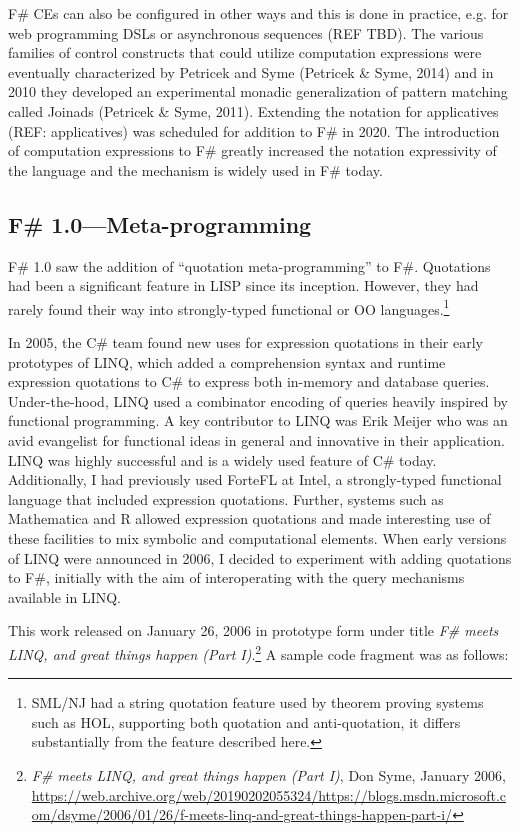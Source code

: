 \documentclass[acmsmall]{acmart}\settopmatter{}
\begin{document}
F\# CEs can also be configured in other ways and this is done in practice, e.g. for web programming DSLs or asynchronous sequences (REF TBD).
The various families of control constructs that could utilize computation expressions were eventually characterized by Petricek
and Syme (Petricek \& Syme, 2014) and in 2010 they developed an experimental monadic generalization of pattern matching called Joinads (Petricek \& Syme, 2011).
Extending the notation for applicatives (REF: applicatives) was scheduled for addition to F\# in 2020. The introduction of computation expressions to F\# greatly increased the notation expressivity of the language
and the mechanism is widely used in F\# today.

\subsection*{F\# 1.0---Meta-programming}

F\# 1.0 saw the addition of “quotation meta-programming” to F\#.  Quotations had been a significant feature in LISP since its inception. However, they had rarely 
found their way into strongly-typed functional or OO languages.\footnote{SML/NJ had a string quotation feature used by theorem proving systems such as HOL, supporting both quotation and anti-quotation, it differs substantially from the feature described here.}


In 2005, the C\# team found new uses for expression quotations in their early prototypes of LINQ, which added a comprehension syntax and runtime expression quotations to C\# to express both in-memory and database queries. Under-the-hood, LINQ used a combinator encoding of queries heavily inspired by functional programming. A key contributor to LINQ was Erik Meijer who was an avid evangelist for functional ideas in general and innovative in their application. LINQ was highly successful and is a widely used feature of C\# today.  Additionally, I had previously used ForteFL at Intel, a strongly-typed functional language that included expression quotations.  Further, systems such as Mathematica and R allowed expression quotations and made interesting use of these facilities to mix symbolic and computational elements. When early versions of LINQ were announced in 2006, I decided to experiment with adding quotations to F\#, initially with the aim of interoperating with the query mechanisms available in LINQ.  

This work released on January 26, 2006 in prototype form under title \textit{F\# meets LINQ, and great things happen (Part I)}.\footnote{\textit{F\# meets LINQ, and great things happen (Part I)}, Don Syme, January 2006, \url{https://web.archive.org/web/20190202055324/https://blogs.msdn.microsoft.com/dsyme/2006/01/26/f-meets-linq-and-great-things-happen-part-i/}}   A sample code fragment was as follows:
\end{document}
